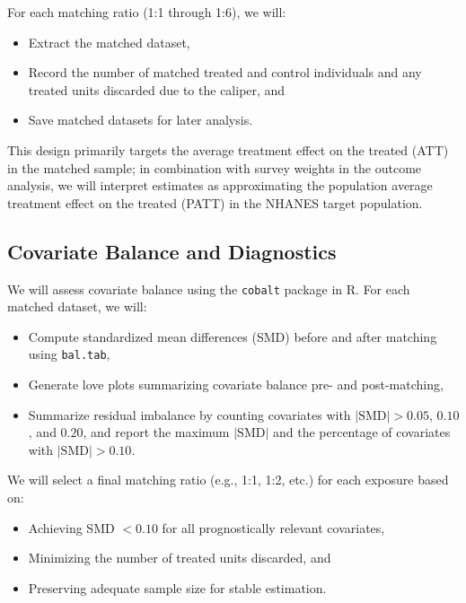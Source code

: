 \documentclass{article}
\begin{document}
For each matching ratio (1:1 through 1:6), we will:

\begin{itemize}
    \item Extract the matched dataset,

    \item Record the number of matched treated and control individuals and any treated units discarded due to the caliper, and

    \item Save matched datasets for later analysis.

\end{itemize}

This design primarily targets the average treatment effect on the treated (ATT) in the matched sample; in combination with survey weights in the outcome analysis, we will interpret estimates as approximating the population average treatment effect on the treated (PATT) in the NHANES target population.

\subsection{Covariate Balance and Diagnostics}

We will assess covariate balance using the \texttt{cobalt} package in R. For each matched dataset, we will:

\begin{itemize}
    \item Compute standardized mean differences (SMD) before and after matching using \texttt{bal.tab},

    \item Generate love plots summarizing covariate balance pre- and post-matching,

    \item Summarize residual imbalance by counting covariates with $|\text{SMD}| > 0.05$, $0.10$, and $0.20$, and report the maximum $|\text{SMD}|$ and the percentage of covariates with $|\text{SMD}| > 0.10$.

\end{itemize}

We will select a final matching ratio (e.g., 1:1, 1:2, etc.) for each exposure based on:

\begin{itemize}
    \item Achieving SMD $< 0.10$ for all prognostically relevant covariates,

    \item Minimizing the number of treated units discarded, and

    \item Preserving adequate sample size for stable estimation.

\end{itemize}
\end{document}
